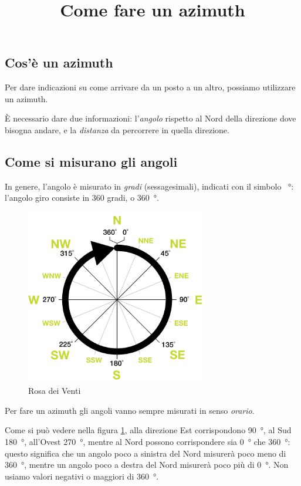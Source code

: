 \documentclass[12pt]{article}
\title{Come fare un azimuth}
\author{}
\begin{document}
\maketitle

\subsection*{Cos'è un azimuth}

Per dare indicazioni su come arrivare da un posto a un altro, possiamo utilizzare un azimuth. 

È necessario dare due informazioni: l'\emph{angolo} rispetto al Nord della direzione dove bisogna andare, e la \emph{distanza} da percorrere in quella direzione. 

\subsection*{Come si misurano gli angoli}

In genere, l'angolo è misurato in \emph{gradi} (sessagesimali), indicati con il simbolo \SI{}{\degree}: l'angolo giro consiste in 360 gradi, o \SI{360}{\degree}. 

\begin{figure}[ht]
\centering
\includegraphics[width=0.7\textwidth]{figures/CompassRoseSimple.png}
\caption{Rosa dei Venti}
\label{fig:rosa-venti}
\end{figure}

Per fare un azimuth gli angoli vanno sempre misurati in senso \emph{orario}. 

Come si può vedere nella figura \ref{fig:rosa-venti}, alla direzione Est corrispondono \SI{90}{\degree}, al Sud \SI{180}{\degree}, all'Ovest \SI{270}{\degree}, mentre al Nord possono corrispondere sia \SI{0}{\degree} che \SI{360}{\degree}: questo significa che un angolo poco a sinistra del Nord misurerà poco meno di \SI{360}{\degree}, mentre un angolo poco a destra del Nord misurerà poco più di \SI{0}{\degree}. Non usiamo valori negativi o maggiori di \SI{360}{\degree}. 
\end{document}
